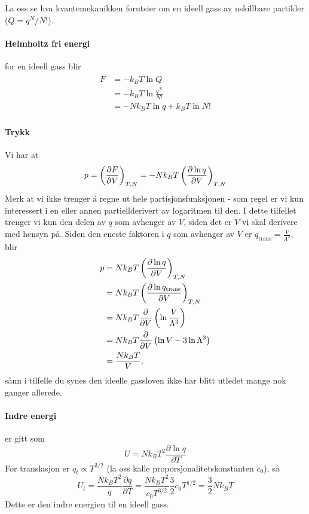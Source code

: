 La oss se hva kvantemekanikken forutsier om en ideell gass av uskillbare partikler ($Q=q^N/N!$). 

\paragraph{Helmholtz fri energi} for en ideell gass blir
\begin{align}
\begin{split}
	F&=-k_BT\ln Q\\&=-k_BT\ln\frac{q^N}{N!}\\&=-Nk_BT\ln q+k_BT\ln N!
\end{split}
\end{align}

\paragraph{Trykk} Vi har at
\begin{equation}
	p = \left(\frac{\partial F}{\partial V}\right)_{T,N} = -Nk_BT\left(\frac{\partial \ln q}{\partial V}\right)_{T,N}
\end{equation}
Merk at vi ikke trenger å regne ut hele partisjonsfunksjonen - som regel er vi kun interessert i en eller annen partiellderivert av logaritmen til den. I dette tilfellet trenger vi kun den delen av $q$ som avhenger av $V$, siden det er $V$ vi skal derivere med hensyn på. Siden den eneste faktoren i $q$ som avhenger av $V$ er $q_{\text{trans}}=\frac{V}{\Lambda^3}$, blir 
\begin{align}
\begin{split}
	p &= Nk_BT\left(\frac{\partial \ln q}{\partial V}\right)_{T,N} \\
	&= Nk_BT\left(\frac{\partial \ln q_{\text{trans}}}{\partial V}\right)_{T,N} \\
	&= Nk_BT\frac{\partial }{\partial V}\left(\ln\frac{V}{\Lambda^3}\right) \\
	&= Nk_BT\frac{\partial }{\partial V}\left(\ln V - 3\ln\Lambda^3\right) \\
	&= \frac{Nk_BT}{V},
\end{split}
\end{align}
sånn i tilfelle du synes den ideelle gassloven ikke har blitt utledet mange nok ganger allerede.

\paragraph{Indre energi} er gitt som
\begin{equation}
	U=Nk_BT^2\frac{\partial \ln q}{\partial T}
\end{equation}
For translasjon er $q_t\propto T^{3/2}$ (la oss kalle proporsjonalitetskonstanten $c_0$), så
\begin{equation}
	U_t=\frac{Nk_BT^2}{q}\frac{\partial q}{\partial T}=\frac{Nk_BT^2}{c_0T^{3/2}}\frac{3}{2}c_0T^{1/2}=\frac{3}{2}Nk_BT
\end{equation}
Dette er den indre energien til en ideell gass.

